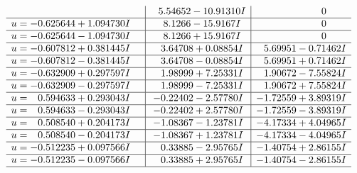 \documentclass[1p]{elsarticle_modified}
\theoremstyle{definition}
\begin{document}
$$\begin{array}{c|c|c}
 & \phantom{-}5.54652 - 10.91310 I & \phantom{-0.000000 } 0 \\ \hline\begin{aligned}
u &= -0.625644 + 1.094730 I\end{aligned}
 & \phantom{-}8.1266 - 15.9167 I & \phantom{-0.000000 } 0 \\ \hline\begin{aligned}
u &= -0.625644 - 1.094730 I\end{aligned}
 & \phantom{-}8.1266 + 15.9167 I & \phantom{-0.000000 } 0 \\ \hline\begin{aligned}
u &= -0.607812 + 0.381445 I\end{aligned}
 & \phantom{-}3.64708 + 0.08854 I & \phantom{-}5.69951 - 0.71462 I \\ \hline\begin{aligned}
u &= -0.607812 - 0.381445 I\end{aligned}
 & \phantom{-}3.64708 - 0.08854 I & \phantom{-}5.69951 + 0.71462 I \\ \hline\begin{aligned}
u &= -0.632909 + 0.297597 I\end{aligned}
 & \phantom{-}1.98999 + 7.25331 I & \phantom{-}1.90672 - 7.55824 I \\ \hline\begin{aligned}
u &= -0.632909 - 0.297597 I\end{aligned}
 & \phantom{-}1.98999 - 7.25331 I & \phantom{-}1.90672 + 7.55824 I \\ \hline\begin{aligned}
u &= \phantom{-}0.594633 + 0.293043 I\end{aligned}
 & -0.22402 - 2.57780 I & -1.72559 + 3.89319 I \\ \hline\begin{aligned}
u &= \phantom{-}0.594633 - 0.293043 I\end{aligned}
 & -0.22402 + 2.57780 I & -1.72559 - 3.89319 I \\ \hline\begin{aligned}
u &= \phantom{-}0.508540 + 0.204173 I\end{aligned}
 & -1.08367 - 1.23781 I & -4.17334 + 4.04965 I \\ \hline\begin{aligned}
u &= \phantom{-}0.508540 - 0.204173 I\end{aligned}
 & -1.08367 + 1.23781 I & -4.17334 - 4.04965 I \\ \hline\begin{aligned}
u &= -0.512235 + 0.097566 I\end{aligned}
 & \phantom{-}0.33885 - 2.95765 I & -1.40754 + 2.86155 I \\ \hline\begin{aligned}
u &= -0.512235 - 0.097566 I\end{aligned}
 & \phantom{-}0.33885 + 2.95765 I & -1.40754 - 2.86155 I\\
 \hline 
 \end{array}$$\newpage
\end{document}

